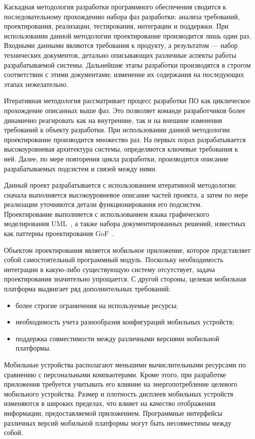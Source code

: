 Каскадная методология разработки программного обеспечения сводится
к последовательному прохождению набора фаз разработки:
анализа требований, проектирования, реализации, тестирования, интеграции и поддержки.
При использовании данной методологии проектирование производится
лишь один раз. Входными данными являются требования к продукту,
а результатом --- набор технических документов, детально описывающих
различные аспекты работы разрабатываемой системы.
Дальнейшие этапы разработки производятся в строгом соответствии с этими документами;
изменение их содержания на последующих этапах нежелательно.

Итеративная методология рассматривает процесс разработки ПО как
циклическое прохождение описанных выше фаз.
Это позволяет команде разработчиков более динамично реагировать
как на внутренние, так и на внешние изменения требований к объекту разработки.
При использовании данной методологии проектирование производится множество раз.
На первых порах разрабатывается высокоуровневая архитектура системы,
определяются ключевые требования к ней. Далее, по мере повторения цикла
разработки, производится описание разрабатываемых подсистем и связей между ними.

Данный проект разрабатывается с использованием итеративной методологии:
сначала выполняется высокоуровневое описание частей проекта,
а затем по мере реализации уточняются детали функционирования его подсистем.
Проектирование выполняется с использованием языка графического
моделирования UML~\cite{fowler04}, а также набора документированных решений,
известных как паттерны проектирования GoF~\cite{gamma01}.

Объектом проектирования является мобильное приложение,
которое представляет собой самостоятельный программный модуль.
Поскольку необходимость интеграции в какую-либо существующую
систему отсутствует, задача проектирования значительно упрощается.
С другой стороны, целевая мобильная платформа выдвигает ряд дополнительных
требований:
\begin{itemize}
\item более строгие ограничения на используемые ресурсы;
\item необходимость учета разнообразия конфигураций мобильных устройств;
\item поддержка совместимости между различными версиями
  мобильной платформы.
\end{itemize}

Мобильные устройства располагают меньшими вычислительными
ресурсами по сравнению с персональными компьютерами.
Кроме этого, при разработке приложения
требуется учитывать его влияние на энергопотребление
целевого мобильного устройства.
Размер и плотность дисплеев мобильных устройств изменяются в широких пределах,
что влияет на качество отображения информации, предоставляемой приложением.
Программные интерфейсы различных версий мобильной платформы
могут быть несовместимы между собой.

